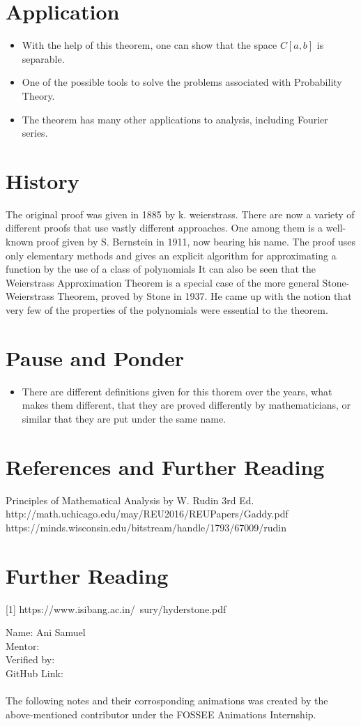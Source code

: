 \documentclass[12pt,a4paper]{article}
\begin{document}
\section{Application}

\begin{itemize}
    \item With the help of this theorem, one can show that the space $C[a, b]$ is separable.
    \item One of the possible tools to solve the problems associated with Probability Theory.
    \item The theorem has many other applications to analysis, including Fourier series.
\end{itemize}


\section{History}
The original proof was given in 1885 by k. weierstrass. There are now a variety of different proofs that use vastly different approaches. One among them is a  well-known proof given by  S. Bernstein in 1911,  now bearing his name. The proof uses only elementary methods and gives an explicit algorithm for
approximating a function by the use of a class of polynomials It can also be seen that the Weierstrass Approximation Theorem is a special case of the more general Stone-Weierstrass Theorem, proved by
Stone in 1937. He came up with the notion that very few of the properties of the polynomials were essential to the theorem.
 
\section{Pause and Ponder}
\begin{itemize}
    \item There are different definitions given for this thorem over the years, what makes them different, that they are proved differently by mathematicians, or similar that they are put under the same name.
\end{itemize}
\section{References and  Further Reading}

\begin{thebibliography}{}
\bibitem{} Principles of Mathematical Analysis by W. Rudin 3rd Ed.
\bibitem{} http://math.uchicago.edu/may/REU2016/REUPapers/Gaddy.pdf
\bibitem{} https://minds.wisconsin.edu/bitstream/handle/1793/67009/rudin%
\end{thebibliography}
\section*{Further Reading}
[1] https://www.isibang.ac.in/~sury/hyderstone.pdf

Name: Ani Samuel\\
Mentor: \\
Verified by:\\
GitHub Link: \\\\
The following notes and their corrosponding animations was created by the above-mentioned contributor under the FOSSEE Animations Internship.
\end{document}
